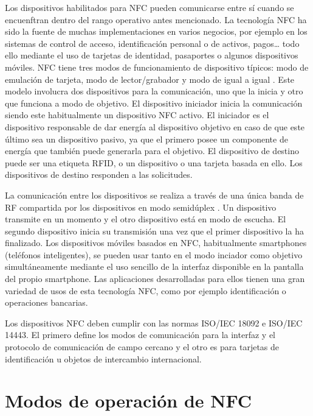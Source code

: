 \documentclass[12pt,a4paper,onecolumn,oneside]{report}
\begin{document}
Los dispositivos habilitados para NFC pueden comunicarse entre sí cuando se encuenftran dentro del rango operativo antes mencionado. La tecnología NFC ha sido la fuente de muchas implementaciones en varios negocios, por ejemplo en los sistemas de control de acceso, identificación personal o de activos, pagos… todo ello mediante el uso de tarjetas de identidad, pasaportes o algunos dispositivos móviles.
NFC tiene tres modos de funcionamiento de dispositivo típicos: modo de emulación de tarjeta, modo de lector/grabador y modo de igual a igual \cite{tres}. Este modelo involucra dos dispositivos para la comunicación, uno que la inicia y otro que funciona a modo de objetivo. El dispositivo iniciador inicia la comunicación siendo este habitualmente un dispositivo NFC activo. El iniciador es el dispositivo responsable de dar energía al dispositivo objetivo en caso de que este último sea un dispositivo pasivo, ya que el primero posee un componente de energía que también puede generarla para el objetivo. El dispositivo de destino puede ser una etiqueta RFID, o un dispositivo o una tarjeta basada en ello. Los dispositivos de destino responden a las solicitudes.

La comunicación entre los dispositivos se realiza a través de una única banda de RF compartida por los dispositivos en modo semidúplex \cite{cuatro}. Un dispositivo transmite en un momento y el otro dispositivo está en modo de escucha. El segundo dispositivo inicia su transmisión una vez que el primer dispositivo la ha finalizado. Los dispositivos móviles basados en NFC, habitualmente smartphones (teléfonos inteligentes), se pueden usar tanto en el modo inciador como objetivo simultáneamente mediante el uso sencillo de la interfaz disponible en la pantalla del propio smartphone. Las aplicaciones desarrolladas para ellos tienen una gran variedad de usos de esta tecnología NFC, como por ejemplo identificación o operaciones bancarias.

Los dispositivos NFC deben cumplir con las normas ISO/IEC 18092 e ISO/IEC 14443. El primero define los modos de comunicación para la interfaz y el protocolo de comunicación de campo cercano y el otro es para tarjetas de identificación u objetos de intercambio internacional.

\section*{Modos de operación de NFC}
\end{document}
